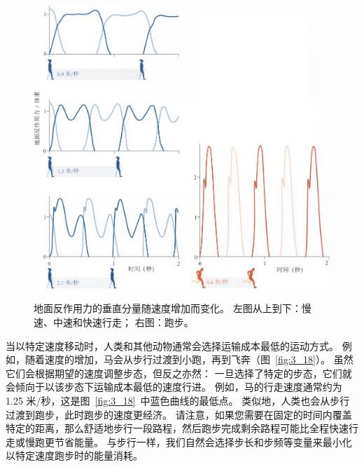 \begin{figure}[!htb]
	\centering
	\includegraphics[width=1.0\linewidth]{chap3/3_17}
	\caption{地面反作用力的垂直分量随速度增加而变化。
		左图从上到下：慢速、中速和快速行走；
		右图：跑步\cite{alexander1984walking}。 \label{fig:3_17}}
\end{figure}


当以特定速度移动时，人类和其他动物通常会选择运输成本最低的运动方式。
例如，随着速度的增加，马会从步行过渡到小跑，再到飞奔（图~\ref{fig:3_18}）。
虽然它们会根据期望的速度调整步态，但反之亦然：
一旦选择了特定的步态，它们就会倾向于以该步态下运输成本最低的速度行进。
例如，马的行走速度通常约为 1.25 米/秒，这是图~\ref{fig:3_18}~中蓝色曲线的最低点。
类似地，人类也会从步行过渡到跑步，此时跑步的速度更经济。
请注意，如果您需要在固定的时间内覆盖特定的距离，那么舒适地步行一段路程，然后跑步完成剩余路程可能比全程快速行走或慢跑更节省能量。
与步行一样，我们自然会选择步长和步频等变量来最小化以特定速度跑步时的能量消耗。

